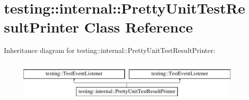 \hypertarget{classtesting_1_1internal_1_1_pretty_unit_test_result_printer}{\section{testing\-:\-:internal\-:\-:Pretty\-Unit\-Test\-Result\-Printer Class Reference}
\label{classtesting_1_1internal_1_1_pretty_unit_test_result_printer}
}
Inheritance diagram for testing\-:\-:internal\-:\-:Pretty\-Unit\-Test\-Result\-Printer\-:\begin{figure}[H]
\begin{center}
\leavevmode
\includegraphics[height=2.000000cm]{classtesting_1_1internal_1_1_pretty_unit_test_result_printer}
\end{center}
\end{figure}
